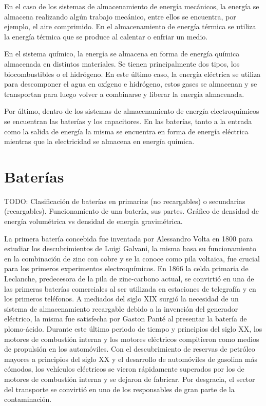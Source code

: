En el caso de los sistemas de almacenamiento de energía mecánicos, la energía se
almacena realizando algún trabajo mecánico, entre ellos se encuentra, por ejemplo,
el aire comprimido. En el almacenamiento de energía térmica se utiliza la energía 
térmica que se produce al calentar o enfriar un medio.

En el sistema químico, la energía se almacena en forma de energía química 
almacenada en distintos materiales. Se tienen principalmente dos tipos, los
biocombustibles o el hidrógeno. En este último caso, la energía eléctrica se 
utiliza para descomponer el agua en oxígeno e hidrógeno, estos gases se almacenan 
y se transportan para luego volver a combinarse y liberar la energía almacenada.

Por último, dentro de los sistemas de almacenamiento de energía electroquímicos 
se encuentran las baterías y los capacitores. En las baterías, tanto a la entrada 
como la salida de energía la misma se encuentra en forma de energía eléctrica 
mientras que la electricidad se almacena en energía química. 


\section{Baterías}

TODO: Clasificación de baterías en primarias (no recargables) o secundarias 
(recargables). Funcionamiento de una batería, sus partes. Gráfico de densidad
de energía volumétrica vs densidad de energía gravimétrica.

La primera batería concebida fue inventada por Alessandro Volta en 1800 para 
estudiar los descubrimientos de Luigi Galvani, la misma basa su funcionamiento 
en la combinación de zinc con cobre y se la conoce como pila voltaica, fue 
crucial para los primeros experimentos electroquímicos. En 1866 la celda primaria 
de Leclanche, predecesora de la pila de zinc-carbono actual, se convirtió en una
de las primeras baterías comerciales al ser utilizada en estaciones de telegrafía
y en los primeros teléfonos. A mediados del siglo XIX surgió la necesidad de un 
sistema de almacenamiento recargable debido a la invención del generador 
eléctrico, la misma fue satisfecha por Gaston Panté al presentar la batería de 
plomo-ácido. Durante este último periodo de tiempo y principios del siglo XX, 
los motores de combustión interna y los motores eléctricos compitieron como medios
de propulsión en los automóviles. Con el descubrimiento de reservas de petróleo 
mayores a principios del siglo XX y el desarrollo de automóviles de gasolina más
cómodos, los vehículos eléctricos se vieron rápidamente superados por los de 
motores de combustión interna y se dejaron de fabricar. Por desgracia, el sector 
del transporte se convirtió en uno de los responsables de gran parte de la 
contaminación.

